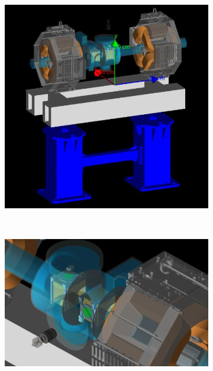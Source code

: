 \begin{figure}[!ht]
	\begin{subfigure}[t]{0.2\textwidth}
		\includegraphics[width=\textwidth]{05_Conclusion/figures/fig000_geant4_sim2_a}
		\caption{}
		\label{}
	\end{subfigure}
	~
	\begin{subfigure}[t]{0.8\textwidth}
		\includegraphics[width=\textwidth]{05_Conclusion/figures/fig000_geant4_sim2_b}
		\caption{}
		\label{}
	\end{subfigure}
	\caption[]{}
	\label{chap:}
\end{figure}
